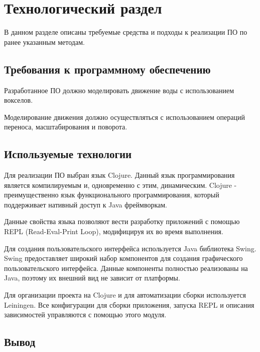 \chapter{Технологический раздел}
\label{cha:impl}

В данном разделе описаны требуемые средства и подходы к реализации ПО по ранее указанным методам.


\section{Требования к программному обеспечению}

Разработанное ПО должно моделировать движение воды с использованием вокселов.
%

Моделирование движения должно осуществляться с использованием операций переноса, масштабирования и поворота.

\section{Используемые технологии}

Для реализации ПО выбран язык Clojure. Данный язык программирования является
компилируемым и, одновременно с этим, динамическим. Clojure - преимущественно
язык функционального программирования, который поддерживает нативный доступ к
Java фреймворкам.

Данные свойства языка позволяют вести разработку приложений с помощью REPL
(Read-Eval-Print Loop), модифицируя их во время выполнения.

Для создания пользовательского интерфейса используется Java библиотека Swing.
Swing предоставляет широкий набор компонентов для создания графического пользовательского
интерфейса. Данные компоненты полностью реализованы на Java, поэтому их внешний вид не зависит
от платформы.

Для организации проекта на Clojure и для автоматизации сборки используется Leiningen.
Все конфигурации для сборки приложения, запуска REPL и описания зависимостей управляются с помощью
этого модуля.

\section{Вывод}

